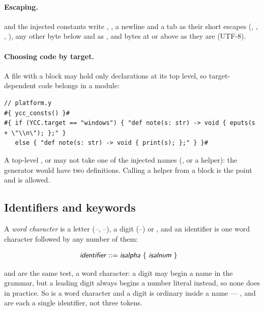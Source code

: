 \paragraph{Escaping.}  and the injected constants write
\ic{\textbackslash\textbackslash}, , a newline and a tab as their
short escapes (\ic{\textbackslash\textbackslash},
, , ), any
other byte below  and  as
, and bytes at or above  as they are
(UTF-8).

\paragraph{Choosing code by target.} A file with a block may hold only
declarations at its top level, so target-dependent code belongs in a module:

\begin{lstlisting}
// platform.y
#{ ycc_consts() }#
#{ if (YCC.target == "windows") { "def note(s: str) -> void { eputs(s + \"\\n\"); };" }
   else { "def note(s: str) -> void { print(s); };" } }#
\end{lstlisting}

\noindent A top-level ,  or  may not take one of
the injected names (,  or a  helper):
the generator would have two definitions. Calling a  helper from
a block is the point and is allowed.

\subsection{Identifiers and keywords}

A \emph{word character} is a letter (--, --), a
digit (--) or \ic{\_}, and an identifier is one word character
followed by any number of them:

\begin{align*}
\textsf{\textit{identifier}} &::= \textsf{\textit{isalpha}}~\{~\textsf{\textit{isalnum}}~\}
\end{align*}

\noindent {} and  are the same test, a word
character: a digit may begin a name in the grammar, but a leading digit
always begins a number literal instead, so none does in practice. So
\ic{\_} is a word character and a digit is ordinary inside a name ---
,  and  are each a single identifier, not
three tokens.

